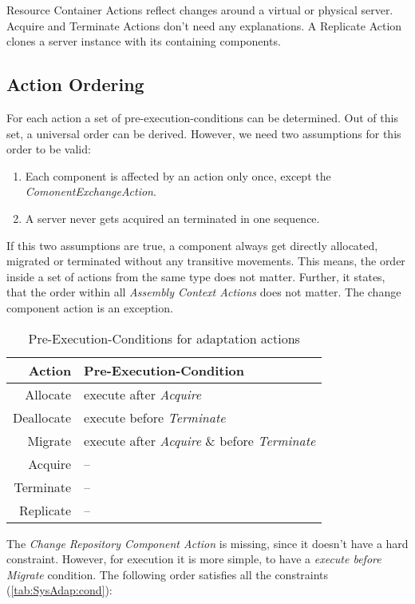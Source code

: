 Resource Container Actions reflect changes around a virtual or physical server. Acquire and Terminate Actions don't need any explanations. A Replicate Action clones a server instance with its containing components.

\subsection{Action Ordering}

For each action a set of pre-execution-conditions can be determined. Out of this set, a universal order can be derived. However, we need two assumptions for this order to be valid:
\begin{enumerate}
	\setlength\itemsep{0em}
	\item Each component is affected by an action only once, except the \textit{ComonentExchangeAction}.
	\item A server never gets acquired an terminated in one sequence.
\end{enumerate}

If this two assumptions are true, a component always get directly allocated, migrated or terminated without any transitive movements. This means, the order inside a set of actions from the same type does not matter. Further, it states, that the order within all \textit{Assembly Context Actions} does not matter. The change component action is an exception.

\begin{table}[h]
	\centering
	\begin{tabular}{r | l}
		\hline
		\textbf{Action} & \textbf{Pre-Execution-Condition} \\
		\hline
		Allocate & execute after \textit{Acquire} \\
		Deallocate & execute before \textit{Terminate} \\
		Migrate & execute after \textit{Acquire} \& before \textit{Terminate} \\
		Acquire & -- \\
		Terminate & -- \\
		Replicate & -- \\
		\hline
	\end{tabular}
	\caption{Pre-Execution-Conditions for adaptation actions}
	\label{tab:SysAdap:cond}
\end{table}

The \textit{Change Repository Component Action} is missing, since it doesn't have a hard constraint. However, for execution it is more simple, to have a \textit{execute before Migrate} condition. The following order satisfies all the constraints (\autoref{tab:SysAdap:cond}):

